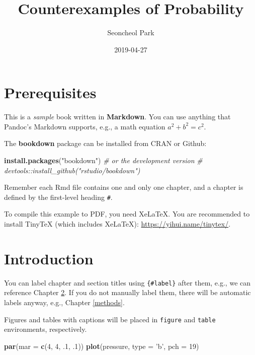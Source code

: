 \documentclass[b5paper,]{scrbook}
\title{Counterexamples of Probability}
\author{Seoncheol Park}
\date{2019-04-27}
\newenvironment{Shaded}{\begin{snugshade}}{\end{snugshade}}
\newcommand{\CommentTok}[1]{\textcolor[rgb]{0.56,0.35,0.01}{\textit{#1}}}
\newcommand{\DataTypeTok}[1]{\textcolor[rgb]{0.13,0.29,0.53}{#1}}
\newcommand{\DecValTok}[1]{\textcolor[rgb]{0.00,0.00,0.81}{#1}}
\newcommand{\FloatTok}[1]{\textcolor[rgb]{0.00,0.00,0.81}{#1}}
\newcommand{\KeywordTok}[1]{\textcolor[rgb]{0.13,0.29,0.53}{\textbf{#1}}}
\newcommand{\NormalTok}[1]{#1}
\newcommand{\StringTok}[1]{\textcolor[rgb]{0.31,0.60,0.02}{#1}}
\theoremstyle{definition}
\theoremstyle{definition}
\theoremstyle{definition}
\theoremstyle{remark}
\begin{document}
\maketitle

{
\hypersetup{linkcolor=Black}
\setcounter{tocdepth}{2}
\tableofcontents
}
\hypertarget{prerequisites}{%
\chapter{Prerequisites}\label{prerequisites}}

This is a \emph{sample} book written in \textbf{Markdown}. You can use anything that Pandoc's Markdown supports, e.g., a math equation \(a^2 + b^2 = c^2\).

The \textbf{bookdown} package can be installed from CRAN or Github:

\begin{Shaded}
\begin{Highlighting}[]
\KeywordTok{install.packages}\NormalTok{(}\StringTok{"bookdown"}\NormalTok{)}
\CommentTok{# or the development version}
\CommentTok{# devtools::install_github("rstudio/bookdown")}
\end{Highlighting}
\end{Shaded}

Remember each Rmd file contains one and only one chapter, and a chapter is defined by the first-level heading \texttt{\#}.

To compile this example to PDF, you need XeLaTeX. You are recommended to install TinyTeX (which includes XeLaTeX): \url{https://yihui.name/tinytex/}.

\hypertarget{intro}{%
\chapter{Introduction}\label{intro}}

You can label chapter and section titles using \texttt{\{\#label\}} after them, e.g., we can reference Chapter \ref{intro}. If you do not manually label them, there will be automatic labels anyway, e.g., Chapter \ref{methods}.

Figures and tables with captions will be placed in \texttt{figure} and \texttt{table} environments, respectively.

\begin{Shaded}
\begin{Highlighting}[]
\KeywordTok{par}\NormalTok{(}\DataTypeTok{mar =} \KeywordTok{c}\NormalTok{(}\DecValTok{4}\NormalTok{, }\DecValTok{4}\NormalTok{, }\FloatTok{.1}\NormalTok{, }\FloatTok{.1}\NormalTok{))}
\KeywordTok{plot}\NormalTok{(pressure, }\DataTypeTok{type =} \StringTok{'b'}\NormalTok{, }\DataTypeTok{pch =} \DecValTok{19}\NormalTok{)}
\end{Highlighting}
\end{Shaded}
\end{document}

